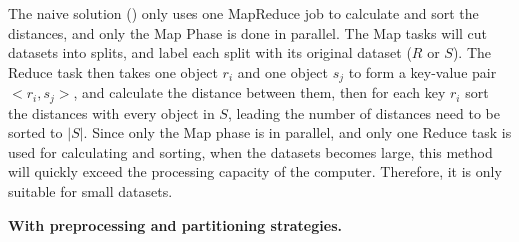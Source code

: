 \noindent The naive solution (\HBK) only uses one MapReduce job to calculate and sort the distances, and only the Map Phase is done in parallel. The Map tasks will cut datasets into splits, and label each split with its original dataset ($R$ or $S$). The Reduce task then takes one object $r_i$ and one object $s_j$ to form a key-value pair $<r_i, s_j>$, and calculate the distance between them, then for each key $r_i$ sort the distances with every object in $S$, leading the number of distances need to be sorted to $|S|$. Since only the Map phase is in parallel, and only one Reduce task is used for calculating and sorting, when the datasets becomes large, this method will quickly exceed the processing capacity of the computer. Therefore, it is only suitable for small datasets.
\vspace{0.3em}

\noindent \textbf{With preprocessing and partitioning strategies.} 


